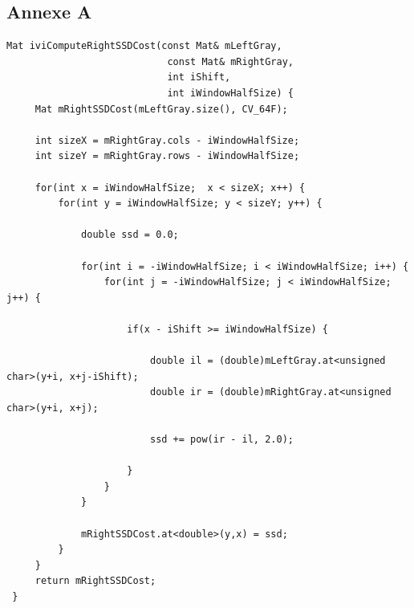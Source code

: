 \documentclass[a4paper,10pt]{article}
\begin{document}
\subsection{Annexe A}
\label{imageDroite}
\begin{lstlisting}[caption=Calcul de la SSD pour l'image droite]
Mat iviComputeRightSSDCost(const Mat& mLeftGray,
                            const Mat& mRightGray,
                            int iShift,
                            int iWindowHalfSize) {
     Mat mRightSSDCost(mLeftGray.size(), CV_64F);

     int sizeX = mRightGray.cols - iWindowHalfSize;
     int sizeY = mRightGray.rows - iWindowHalfSize;
 
     for(int x = iWindowHalfSize;  x < sizeX; x++) {
         for(int y = iWindowHalfSize; y < sizeY; y++) {
 
             double ssd = 0.0;
 
             for(int i = -iWindowHalfSize; i < iWindowHalfSize; i++) {
                 for(int j = -iWindowHalfSize; j < iWindowHalfSize; j++) {
 
                     if(x - iShift >= iWindowHalfSize) {
 
                         double il = (double)mLeftGray.at<unsigned char>(y+i, x+j-iShift);
                         double ir = (double)mRightGray.at<unsigned char>(y+i, x+j);
 
                         ssd += pow(ir - il, 2.0);
 
                     }
                 }
             }
 
             mRightSSDCost.at<double>(y,x) = ssd;
         }
     }
     return mRightSSDCost;
 }
\end{lstlisting}
\end{document}

